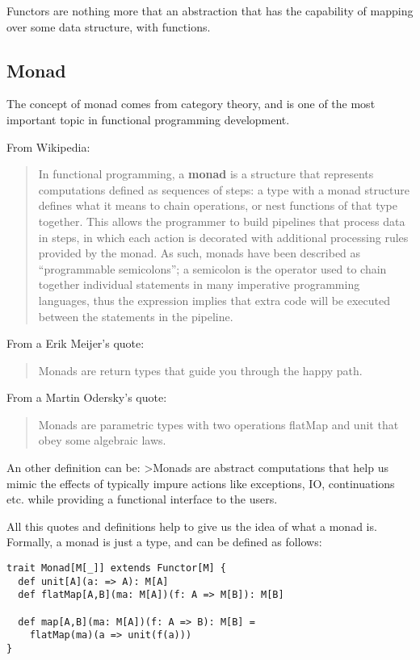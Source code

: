 Functors are nothing more that an abstraction that has the capability of
mapping over some data structure, with functions.

\subsection{Monad}\label{monad}

The concept of monad comes from category theory, and is one of the most
important topic in functional programming development.

From Wikipedia:

\begin{quote}
In functional programming, a \textbf{monad} is a structure that
represents computations defined as sequences of steps: a type with a
monad structure defines what it means to chain operations, or nest
functions of that type together. This allows the programmer to build
pipelines that process data in steps, in which each action is decorated
with additional processing rules provided by the monad. As such, monads
have been described as ``programmable semicolons''; a semicolon is the
operator used to chain together individual statements in many imperative
programming languages, thus the expression implies that extra code will
be executed between the statements in the pipeline.
\end{quote}

From a Erik Meijer's quote:

\begin{quote}
Monads are return types that guide you through the happy path.
\end{quote}

From a Martin Odersky's quote:

\begin{quote}
Monads are parametric types with two operations flatMap and unit that
obey some algebraic laws.
\end{quote}

An other definition can be: \textgreater{}Monads are abstract
computations that help us mimic the effects of typically impure actions
like exceptions, IO, continuations etc. while providing a functional
interface to the users.

All this quotes and definitions help to give us the idea of what a monad
is. Formally, a monad is just a type, and can be defined as follows:

\begin{verbatim}
trait Monad[M[_]] extends Functor[M] {
  def unit[A](a: => A): M[A]
  def flatMap[A,B](ma: M[A])(f: A => M[B]): M[B]

  def map[A,B](ma: M[A])(f: A => B): M[B] =
    flatMap(ma)(a => unit(f(a)))
}
\end{verbatim}

